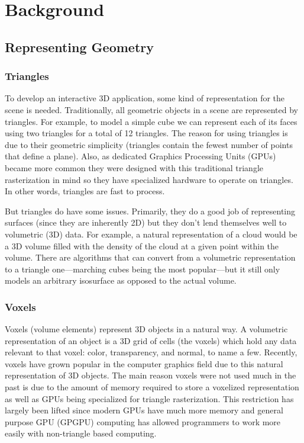 \chapter{Background}

\section{Representing Geometry}
\subsection{Triangles}
To develop an interactive 3D application, some kind of representation for the scene is needed. Traditionally, all geometric objects in a scene are represented by triangles. For example, to model a simple cube we can represent each of its faces using two triangles for a total of 12 triangles. The reason for using triangles is due to their geometric simplicity (triangles contain the fewest number of points that define a plane). Also, as dedicated Graphics Processing Units (GPUs) became more common they were designed with this traditional triangle rasterization in mind so they have specialized hardware to operate on triangles. In other words, triangles are fast to process.

But triangles do have some issues. Primarily, they do a good job of representing surfaces (since they are inherently 2D) but they don't lend themselves well to volumetric (3D) data. For example, a natural representation of a cloud would be a 3D volume filled with the density of the cloud at a given point within the volume. There are algorithms that can convert from a volumetric representation to a triangle one---marching cubes being the most popular---but it still only models an arbitrary isosurface as opposed to the actual volume.

\subsection{Voxels}
Voxels (volume elements) represent 3D objects in a natural way. A volumetric representation of an object is a 3D grid of cells (the voxels) which hold any data relevant to that voxel: color, transparency, and normal, to name a few. Recently, voxels have grown popular in the computer graphics field due to this natural representation of 3D objects. The main reason voxels were not used much in the past is due to the amount of memory required to store a voxelized representation as well as GPUs being specialized for triangle rasterization. This restriction has largely been lifted since modern GPUs have much more memory and general purpose GPU (GPGPU) computing has allowed programmers to work more easily with non-triangle based computing.

